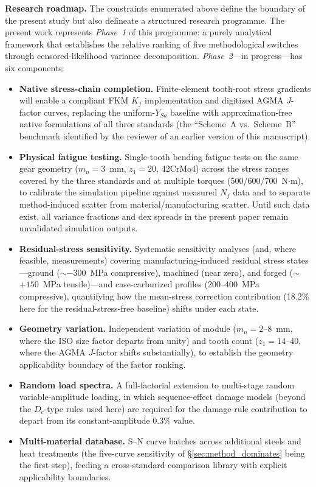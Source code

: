 \documentclass[twocolumn,12pt,a4paper]{article}
\begin{document}
\medskip
\noindent\textbf{Research roadmap.}
The constraints enumerated above define the boundary of the present
study but also delineate a structured research programme. The present
work represents \emph{Phase~1} of this programme: a purely analytical
framework that establishes the relative ranking of five
methodological switches through censored-likelihood variance
decomposition. \emph{Phase~2}---in progress---has six components:
\begin{itemize}
  \item \textbf{Native stress-chain completion.} Finite-element
        tooth-root stress gradients will enable a compliant FKM $K_f$
        implementation and digitized AGMA $J$-factor curves, replacing
        the uniform-$Y_{Sa}$ baseline with approximation-free native
        formulations of all three standards (the ``Scheme~A vs.\
        Scheme~B'' benchmark identified by the reviewer of an earlier
        version of this manuscript).
  \item \textbf{Physical fatigue testing.} Single-tooth bending
        fatigue tests on the same gear geometry ($m_n=3$~mm,
        $z_1=20$, 42CrMo4) across the stress ranges covered by the
        three standards and at multiple torques (500/600/700~N$\cdot$m),
        to calibrate the simulation pipeline against measured $N_f$
        data and to separate method-induced scatter from
        material/manufacturing scatter. Until such data exist, all
        variance fractions and dex spreads in the present paper remain
        unvalidated simulation outputs.
  \item \textbf{Residual-stress sensitivity.} Systematic sensitivity
        analyses (and, where feasible, measurements) covering
        manufacturing-induced residual stress states---ground
        ($\sim$$-300$~MPa compressive), machined (near zero), and
        forged ($\sim$$+150$~MPa tensile)---and case-carburized
        profiles (200--400~MPa compressive), quantifying how the
        mean-stress correction contribution (18.2\% here for the
        residual-stress-free baseline) shifts under each state.
  \item \textbf{Geometry variation.} Independent variation of module
        ($m_n=2$--$8$~mm, where the ISO size factor departs from
        unity) and tooth count ($z_1=14$--$40$, where the AGMA
        $J$-factor shifts substantially), to establish the geometry
        applicability boundary of the factor ranking.
  \item \textbf{Random load spectra.} A full-factorial extension to
        multi-stage random variable-amplitude loading, in which
        sequence-effect damage models (beyond the $D_c$-type rules
        used here) are required for the damage-rule contribution to
        depart from its constant-amplitude 0.3\% value.
  \item \textbf{Multi-material database.} S--N curve
        batches across additional steels and heat treatments (the
        five-curve sensitivity of \S\ref{sec:method_dominates} being
        the first step), feeding a cross-standard comparison library
        with explicit applicability boundaries.
\end{itemize}
\end{document}
